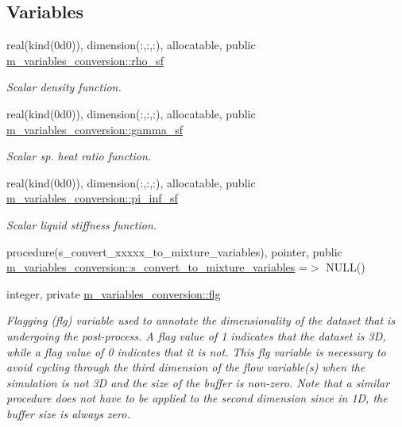 \subsection*{Variables}
\begin{DoxyCompactItemize}
\item 
real(kind(0d0)), dimension(\+:,\+:,\+:), allocatable, public \hyperlink{namespacem__variables__conversion_a8c8453ac97029955f5a3d1247c37059d}{m\+\_\+variables\+\_\+conversion\+::rho\+\_\+sf}
\begin{DoxyCompactList}\small\item\em Scalar density function. \end{DoxyCompactList}\item 
real(kind(0d0)), dimension(\+:,\+:,\+:), allocatable, public \hyperlink{namespacem__variables__conversion_a3a21cf2a54ae67e6a2e22f6cffb97c75}{m\+\_\+variables\+\_\+conversion\+::gamma\+\_\+sf}
\begin{DoxyCompactList}\small\item\em Scalar sp. heat ratio function. \end{DoxyCompactList}\item 
real(kind(0d0)), dimension(\+:,\+:,\+:), allocatable, public \hyperlink{namespacem__variables__conversion_a364012a38a5ba3bcb14bbb6084206fae}{m\+\_\+variables\+\_\+conversion\+::pi\+\_\+inf\+\_\+sf}
\begin{DoxyCompactList}\small\item\em Scalar liquid stiffness function. \end{DoxyCompactList}\item 
procedure(s\+\_\+convert\+\_\+xxxxx\+\_\+to\+\_\+mixture\+\_\+variables), pointer, public \hyperlink{namespacem__variables__conversion_a13c16c62aae8663c39c82c23cff0e84a}{m\+\_\+variables\+\_\+conversion\+::s\+\_\+convert\+\_\+to\+\_\+mixture\+\_\+variables} =$>$ N\+U\+LL()
\item 
integer, private \hyperlink{namespacem__variables__conversion_adcf907c5965b8d933e502c0a7878709b}{m\+\_\+variables\+\_\+conversion\+::flg}
\begin{DoxyCompactList}\small\item\em Flagging (flg) variable used to annotate the dimensionality of the dataset that is undergoing the post-\/process. A flag value of 1 indicates that the dataset is 3D, while a flag value of 0 indicates that it is not. This flg variable is necessary to avoid cycling through the third dimension of the flow variable(s) when the simulation is not 3D and the size of the buffer is non-\/zero. Note that a similar procedure does not have to be applied to the second dimension since in 1D, the buffer size is always zero. \end{DoxyCompactList}\end{DoxyCompactItemize}


